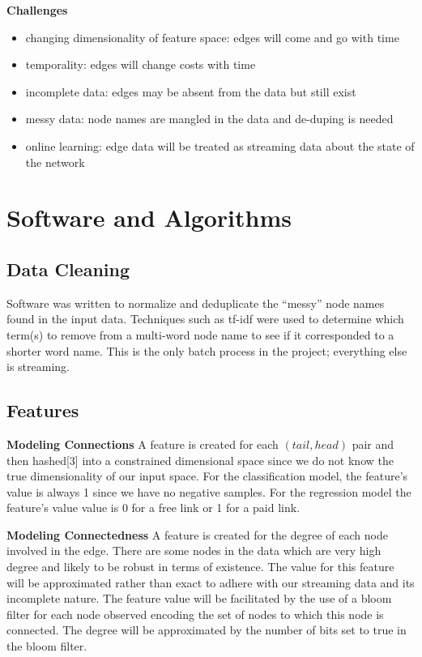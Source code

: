 \documentclass{article} %
\begin{document}
\textbf{Challenges}
\begin{itemize}
\item changing dimensionality of feature space: edges will come and go with time
\item temporality: edges will change costs with time
\item incomplete data: edges may be absent from the data but still exist
\item messy data: node names are mangled in the data and de-duping is needed
\item online learning: edge data will be treated as streaming data about the state of the network
\end{itemize}

\section{Software and Algorithms}

\subsection{Data Cleaning}
Software was written to normalize and deduplicate the ``messy'' node names
found in the input data.  Techniques such as tf-idf were used to determine
which term(s) to remove from a multi-word node name to see if it
corresponded to a shorter word name.  This is the only batch process in the project; everything else is streaming.

\subsection{Features}

\textbf{Modeling Connections} A feature is created for each $(tail,head)$ pair and then hashed[3] into a
constrained dimensional space since we do not know the true dimensionality
of our input space.  For the classification model, the feature's value is always 1
since we have no negative samples.  For the regression model the feature's value value is 0
for a free link or 1 for a paid link.

\textbf{Modeling Connectedness} A feature is created for the degree of each node
  involved in the edge.  There are some nodes in
  the data which are very high degree and likely to be robust in terms of
  existence.  The value for this feature will be approximated rather than
  exact to adhere with our streaming data and its incomplete nature.  The feature value will be facilitated by the use of a
  bloom filter for each node observed encoding the set of nodes to which
  this node is connected.  The degree will be approximated by the
  number of bits set to true in the bloom filter.  
\end{document}
